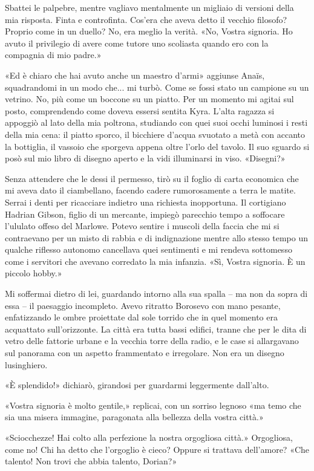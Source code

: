 Sbattei le palpebre, mentre vagliavo mentalmente un migliaio di versioni
della mia risposta. Finta e controfinta. Cos'era che aveva detto il
vecchio filosofo? Proprio come in un duello? No, era meglio la verità.
«No, Vostra signoria. Ho avuto il privilegio di avere come tutore uno
scoliasta quando ero con la compagnia di mio padre.»

«Ed è chiaro che hai avuto anche un maestro d'armi» aggiunse Anaïs,
squadrandomi in un modo che... mi turbò. Come se fossi stato un campione
su un vetrino. No, più come un boccone su un piatto. Per un momento mi
agitai sul posto, comprendendo come doveva essersi sentita Kyra. L'alta
ragazza si appoggiò al lato della mia poltrona, studiando con quei suoi
occhi luminosi i resti della mia cena: il piatto sporco, il bicchiere
d'acqua svuotato a metà con accanto la bottiglia, il vassoio che
sporgeva appena oltre l'orlo del tavolo. Il suo sguardo si posò sul mio
libro di disegno aperto e la vidi illuminarsi in viso. «Disegni?»

Senza attendere che le dessi il permesso, tirò su il foglio di carta
economica che mi aveva dato il ciambellano, facendo cadere rumorosamente
a terra le matite. Serrai i denti per ricacciare indietro una richiesta
inopportuna. Il cortigiano Hadrian Gibson, figlio di un mercante,
impiegò parecchio tempo a soffocare l'ululato offeso del Marlowe. Potevo
sentire i muscoli della faccia che mi si {contraevano} per un misto di
rabbia e di indignazione mentre allo stesso tempo un qualche riflesso
autonomo cancellava quei sentimenti e mi rendeva sottomesso come i
servitori che avevano corredato la mia infanzia. «Sì, Vostra signoria. È
un piccolo hobby.»

Mi soffermai dietro di lei, guardando intorno alla sua spalla -- ma non
da sopra di essa -- il paesaggio incompleto. Avevo ritratto Borosevo con
mano pesante, enfatizzando le ombre proiettate dal sole torrido che in
quel momento era acquattato sull'orizzonte. La città era tutta bassi
edifici, tranne che per le dita di vetro delle fattorie urbane e la
vecchia torre della radio, e le case si allargavano sul panorama con un
aspetto frammentato e irregolare. Non era un disegno lusinghiero.

«È splendido!» dichiarò, girandosi per guardarmi leggermente dall'alto.

«Vostra signoria è molto gentile,» replicai, con un sorriso legnoso «ma
temo che sia una misera immagine, paragonata alla bellezza della vostra
città.»

«Sciocchezze! Hai colto alla perfezione la nostra orgogliosa città.»
Orgogliosa, come no! Chi ha detto che l'orgoglio è cieco? Oppure si
trattava dell'amore? «Che talento! Non trovi che abbia talento, Dorian?»

